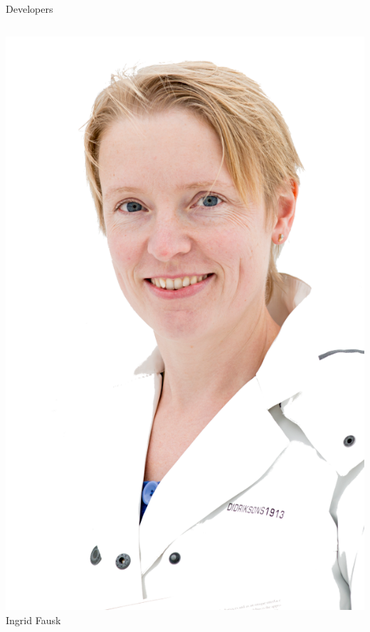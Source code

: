 \documentclass[14pt,c]{beamer}
\begin{document}
\begin{frame}{Developers}
\begin{columns}[t]
    \begin{center}
      \includegraphics[width=\linewidth]{figure/ingrid} \\
      Ingrid Fausk
    \end{center}


\end{columns}
\end{frame}
\end{document}

